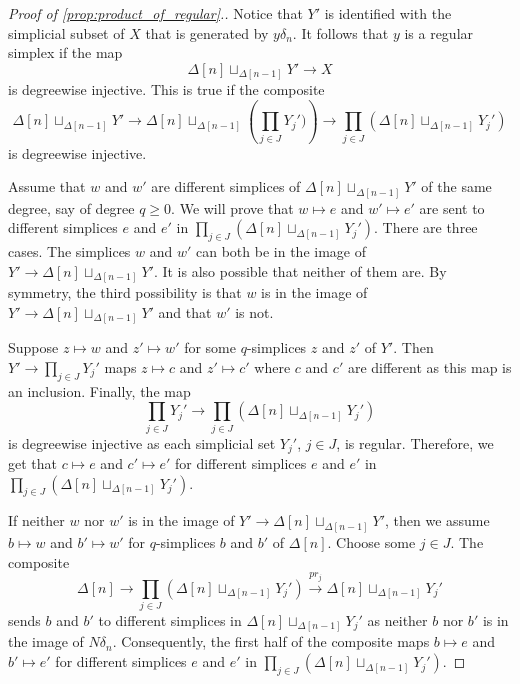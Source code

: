 \begin{proof}[Proof of \cref{prop:product_of_regular}.]
Notice that $Y'$ is identified with the simplicial subset of $X$ that is generated by $y\delta _n$. It follows that $y$ is a regular simplex if the map
\[\Delta [n]\sqcup _{\Delta [n-1]}Y'\to X\]
is degreewise injective. This is true if the composite
\[\Delta [n]\sqcup _{\Delta [n-1]}Y'\to \Delta [n]\sqcup _{\Delta [n-1]}(\prod _{j\in J}{Y_j')})\to \prod _{j\in J}{(\Delta [n]\sqcup _{\Delta [n-1]}Y_j')}\]
is degreewise injective.

Assume that $w$ and $w'$ are different simplices of $\Delta [n]\sqcup _{\Delta [n-1]}Y'$ of the same degree, say of degree $q\geq 0$. We will prove that $w\mapsto e$ and $w'\mapsto e'$ are sent to different simplices $e$ and $e'$ in $\prod _{j\in J}{(\Delta [n]\sqcup _{\Delta [n-1]}Y_j')}$. There are three cases. The simplices $w$ and $w'$ can both be in the image of $Y'\to \Delta [n]\sqcup _{\Delta [n-1]}Y'$. It is also possible that neither of them are. By symmetry, the third possibility is that $w$ is in the image of $Y'\to \Delta [n]\sqcup _{\Delta [n-1]}Y'$ and that $w'$ is not.

Suppose $z\mapsto w$ and $z'\mapsto w'$ for some $q$-simplices $z$ and $z'$ of $Y'$. Then $Y'\to \prod _{j\in J}{Y_j'}$ maps $z\mapsto c$ and $z'\mapsto c'$ where $c$ and $c'$ are different as this map is an inclusion. Finally, the map
\[\prod _{j\in J}{Y_j'}\to \prod _{j\in J}{(\Delta [n]\sqcup _{\Delta [n-1]}Y_j')}\]
is degreewise injective as each simplicial set $Y_j'$, $j\in J$, is regular. Therefore, we get that $c\mapsto e$ and $c'\mapsto e'$ for different simplices $e$ and $e'$ in $\prod _{j\in J}{(\Delta [n]\sqcup _{\Delta [n-1]}Y_j')}$.

If neither $w$ nor $w'$ is in the image of $Y'\to \Delta [n]\sqcup _{\Delta [n-1]}Y'$, then we assume $b\mapsto w$ and $b'\mapsto w'$ for $q$-simplices $b$ and $b'$ of $\Delta [n]$. Choose some $j\in J$. The composite
\[\Delta [n]\to \prod _{j\in J}{(\Delta [n]\sqcup _{\Delta [n-1]}Y_j')}\xrightarrow{pr_j} \Delta [n]\sqcup _{\Delta [n-1]}Y_j'\]
sends $b$ and $b'$ to different simplices in $\Delta [n]\sqcup _{\Delta [n-1]}Y_j'$ as neither $b$ nor $b'$ is in the image of $N\delta _n$. Consequently, the first half of the composite maps $b\mapsto e$ and $b'\mapsto e'$ for different simplices $e$ and $e'$ in $\prod _{j\in J}{(\Delta [n]\sqcup _{\Delta [n-1]}Y_j')}$.


\end{proof}
